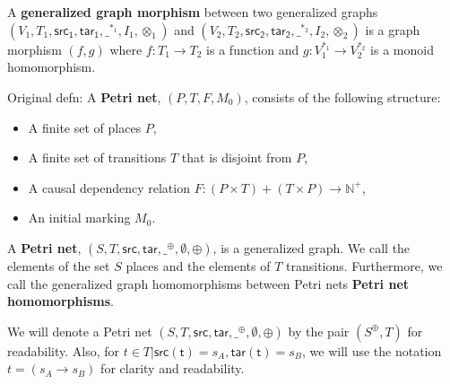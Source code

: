 \begin{definition}
  \label{Petri-net-morphism}
  A \textbf{generalized graph morphism} between two generalized graphs\\
  $(V_1, T_1, \mathsf{src_1}, \mathsf{tar_1}, \_^{*_1},I_1,\otimes_1)$ and
  $(V_2, T_2, \mathsf{src_2}, \mathsf{tar_2}, \_^{*_2},I_2,\otimes_2)$ is a graph morphism
  $(f, g)$ where $f : T_1 \to T_2$ is a function and
  $g: V_1^{*_1} \to V_2^{*_2}$ is a monoid homomorphism.
\end{definition}

\begin{definition}
  \label{def:Original-Petri-Net}
  Original defn: A \textbf{Petri net}, $(P, T, F, M_0)$, consists of the following structure:  
  \begin{itemize}
  \item A finite set of places $P$,
  \item A finite set of transitions $T$ that is disjoint from $P$,
  \item A causal dependency relation $F: (P \times T) + (T \times P) \to \mathbb{N}^+ $, 
  \item An initial marking $M_0$.
  \end{itemize}
\end{definition}
%
\begin{definition}
  \label{def:Petri-Net}
  A \textbf{Petri net}, $(S, T, \mathsf{src},
  \mathsf{tar},\_^{\oplus},\emptyset,\oplus)$, is a generalized graph.  We call
  the elements of the set $S$ places and the elements of $T$
  transitions.  Furthermore, we call the generalized graph
  homomorphisms between Petri nets \textbf{Petri net homomorphisms}.
\end{definition}
We will denote a Petri net $(S, T, \mathsf{src},
\mathsf{tar},\_^{\oplus},\emptyset,\oplus)$ by the pair $(S^\oplus,T)$ for
readability. Also, for $t \in T | \mathsf{src(t)} = s_A , \mathsf{tar(t)} = s_B$, we will use the notation $t = (s_A \rightarrow s_B)$ for clarity and readability. 
%
